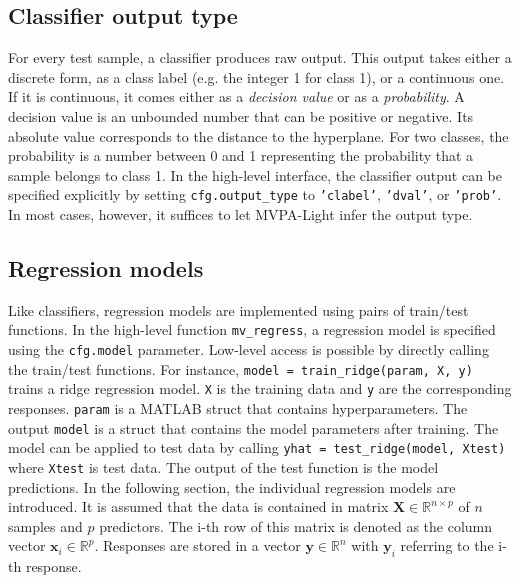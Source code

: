 \documentclass[utf8]{frontiersSCNS} %
\newcommand{\x}{\mathbf{x}}
\newcommand{\y}{\mathbf{y}}
\newcommand{\R}{\mathbb{R}}
\newcommand{\X}{\mathbf{X}}
\newcommand{\ttt}[1]{\texttt{#1}}
\begin{document}
\subsection{Classifier output type}\label{sec:output}

For every test sample, a classifier produces raw output. This output takes either a discrete form, as a class label (e.g. the integer 1 for class 1), or a continuous one. If it is continuous, it comes either as a \textit{decision value} or as a \textit{probability}. A decision value is an unbounded number that can be positive or negative. Its absolute value corresponds to the distance to the hyperplane. For two classes, the probability is a number between 0 and 1 representing the probability that a sample belongs to class 1.
In the high-level interface, the classifier output can be specified explicitly by setting \ttt{cfg.output\_type} to \ttt{'clabel'}, \ttt{'dval'}, or \ttt{'prob'}. In most cases, however, it suffices to let MVPA-Light infer the output type.

\subsection{Regression models}\label{sec:regression}

Like classifiers, regression models are implemented using pairs of train/test functions. In the high-level function \ttt{mv\_regress}, a regression model is specified using the \ttt{cfg.model} parameter. Low-level access is possible by directly calling the train/test functions. For instance, \ttt{model = train\_ridge(param, X, y)} trains a ridge regression model. \ttt{X} is the training data and \ttt{y} are the corresponding responses. \ttt{param} is a MATLAB struct that contains hyperparameters. The output \ttt{model} is a struct that contains the model parameters after training. The model can be applied to test data by calling \ttt{yhat = test\_ridge(model, Xtest)} where \ttt{Xtest} is test data. The output of the test function is the model predictions. In the following section, the individual regression models are introduced. It is assumed that the data is contained in matrix $\X\in\R^{n \times p}$ of $n$ samples and $p$ predictors. The i-th row of this matrix is denoted as the column vector $\x_i\in\R^p$. Responses are stored in a vector $\y\in\R^n$ with $\y_i$ referring to the i-th response.
\end{document}
